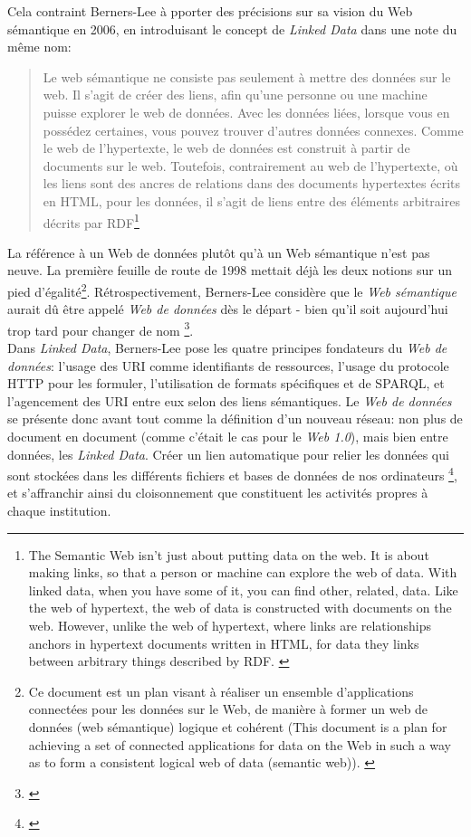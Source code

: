\documentclass[a4paper,12pt,twoside]{book}
\begin{document}
Cela contraint Berners-Lee à pporter des précisions sur sa vision du Web sémantique en 2006, en introduisant le concept de \textit{Linked Data} dans une note du même nom:
\begin{quotation}
    \og Le web sémantique ne consiste pas seulement à mettre des données sur le web. Il s'agit de créer des liens, afin qu'une personne ou une machine puisse explorer le web de données. Avec les données liées, lorsque vous en possédez certaines, vous pouvez trouver d'autres données connexes. Comme le web de l'hypertexte, le web de données est construit à partir de documents sur le web. Toutefois, contrairement au web de l'hypertexte, où les liens sont des ancres de relations dans des documents hypertextes écrits en HTML, pour les données, il s'agit de liens entre des éléments arbitraires décrits par RDF\fg\footnote{\og The Semantic Web isn't just about putting data on the web. It is about making links, so that a person or machine can explore the web of data. With linked data, when you have some of it, you can find other, related, data. Like the web of hypertext, the web of data is constructed with documents on the web. However, unlike the web of hypertext, where links are relationships anchors in hypertext documents written in HTML, for data they links between arbitrary things described by RDF\fg. \cite{berners-leeLinkedData2006}}
\end{quotation}

La référence à un \og Web de données \fg{} plutôt qu'à un \og Web sémantique \fg{} n'est pas neuve. La première feuille de route de 1998 mettait déjà les deux notions sur un pied d'égalité\footnote{\og Ce document est un plan visant à réaliser un ensemble d'applications connectées pour les données sur le Web, de manière à former un web de données (web sémantique) logique et cohérent\fg{} (\og This document is a plan for achieving a set of connected applications for data on the Web in such a way as to form a consistent logical web of data (semantic web)\fg). \cite{berners-leeSemanticWebRoad1998}}. Rétrospectivement, Berners-Lee considère que le \textit{Web sémantique} aurait dû être appelé \textit{Web de données} dès le départ - bien qu'il soit aujourd'hui \og trop tard pour changer de nom \fg\footnote{\cite{berners-leeWebChangeDimension2019}}.\\

Dans \textit{Linked Data}, Berners-Lee pose les quatre principes fondateurs du \textit{Web de données}: l'usage des URI comme identifiants de ressources, l'usage du protocole HTTP pour les formuler, l'utilisation de formats spécifiques et de SPARQL, et l'agencement des URI entre eux selon des liens sémantiques. Le \textit{Web de données} se présente donc avant tout comme la définition d'un nouveau réseau: non plus de document en document (comme c'était le cas pour le \textit{Web 1.0}), mais bien entre données, les \textit{Linked Data}. \og Créer un lien automatique pour relier les données qui sont stockées dans les différents fichiers et bases de données de nos ordinateurs \fg\footnote{\cite{berners-leeWebChangeDimension2019}}, et s'affranchir ainsi du cloisonnement que constituent les activités propres à chaque institution.\\
\end{document}
